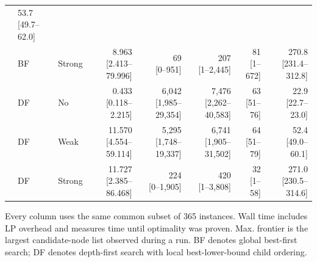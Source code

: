 \begin{table}[t]
\begin{tabular}{@{}lllrrrrr@{}}
      & \shortstack[r]{53.7\\{[49.7--62.0]}} \\
      & BF
      & Strong
      & \shortstack[r]{8.963\\{[2.413--79.996]}}
      & \shortstack[r]{69\\{[0--951]}}
      & \shortstack[r]{207\\{[1--2,445]}}
      & \shortstack[r]{81\\{[1--672]}}
      & \shortstack[r]{270.8\\{[231.4--312.8]}} \\
      & DF
      & No
      & \shortstack[r]{0.433\\{[0.118--2.215]}}
      & \shortstack[r]{6,042\\{[1,985--29,354]}}
      & \shortstack[r]{7,476\\{[2,262--40,583]}}
      & \shortstack[r]{63\\{[51--76]}}
      & \shortstack[r]{22.9\\{[22.7--23.0]}} \\
      & DF
      & Weak
      & \shortstack[r]{11.570\\{[4.554--59.114]}}
      & \shortstack[r]{5,295\\{[1,748--19,337]}}
      & \shortstack[r]{6,741\\{[1,905--31,502]}}
      & \shortstack[r]{64\\{[51--79]}}
      & \shortstack[r]{52.4\\{[49.0--60.1]}} \\
      & DF
      & Strong
      & \shortstack[r]{11.727\\{[2.385--86.468]}}
      & \shortstack[r]{224\\{[0--1,905]}}
      & \shortstack[r]{420\\{[1--3,808]}}
      & \shortstack[r]{32\\{[1--58]}}
      & \shortstack[r]{271.0\\{[230.5--314.6]}} \\
    \bottomrule
  \end{tabular}

  \vspace{2pt}
  \parbox{0.98\textwidth}{\footnotesize
    Every column uses the same common subset of 365 instances. Wall time
    includes LP overhead and measures time until optimality was proven.
    Max. frontier is the largest candidate-node list observed during a run.
    BF denotes global best-first search; DF denotes depth-first search with
    local best-lower-bound child ordering.}
\end{table}
